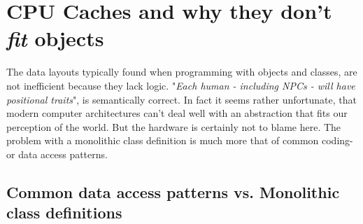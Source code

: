 \section{CPU Caches and why they don't \textit{fit} objects}\label{cpu_caches}
The data layouts typically found when programming with objects and classes, are not inefficient because they lack logic. "\textit{Each human - including NPCs - will have positional traits}", is semantically correct. In fact it seems rather unfortunate, that modern computer architectures can't deal well with an abstraction that fits our perception of the world. But the hardware is certainly not to blame here. The problem with a monolithic class definition is much more that of common coding- or data access patterns.\\
\subsection{Common data access patterns vs. Monolithic class definitions}\label{cdap}

